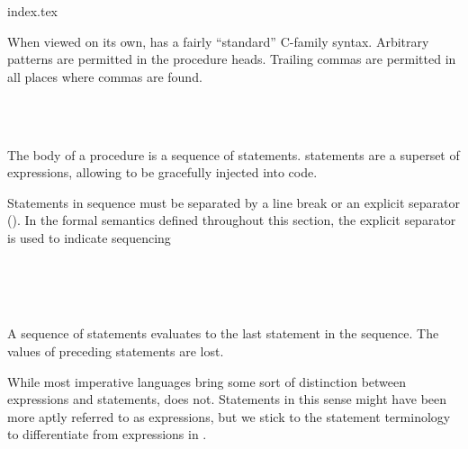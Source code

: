 {index.tex}

When viewed on its own, \Prose{} has a fairly ``standard'' C-family syntax.
Arbitrary patterns are permitted in the procedure heads.
Trailing commas are permitted in all places where commas are found.

\begin{bnf*}
     \\
     \\
\end{bnf*}

The body of a procedure is a sequence of statements. \Prose{} statements
are a superset of \Poetry{} expressions, allowing \Poetry{} to be gracefully
injected into \Prose{} code.

Statements in sequence must be separated by a line break or an explicit separator
(\op{,}). In the formal semantics defined throughout this section, the explicit
separator is used to indicate sequencing

\begin{bnf*}
     \\
     \\
     \\
\end{bnf*}

A sequence of statements evaluates to the last statement in the sequence.
The values of preceding statements are lost.

\begin{prooftree}
\end{prooftree}

While most imperative languages bring some sort of distinction between
expressions and statements, \Prose{} does not. Statements in this
sense might have been more aptly referred to as expressions, but we
stick to the statement terminology to differentiate from expressions
in \Poetry{}.

